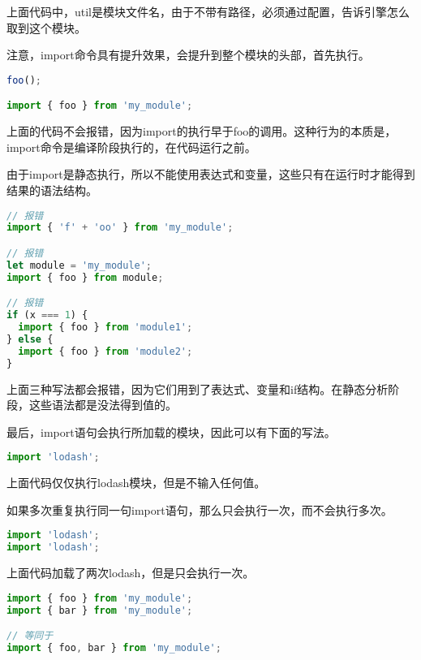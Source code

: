 上面代码中，util是模块文件名，由于不带有路径，必须通过配置，告诉引擎怎么取到这个模块。

注意，import命令具有提升效果，会提升到整个模块的头部，首先执行。

\begin{lstlisting}[language=JavaScript]
foo();

import { foo } from 'my_module';
\end{lstlisting}


上面的代码不会报错，因为import的执行早于foo的调用。这种行为的本质是，import命令是编译阶段执行的，在代码运行之前。



由于import是静态执行，所以不能使用表达式和变量，这些只有在运行时才能得到结果的语法结构。


\begin{lstlisting}[language=JavaScript]
// 报错
import { 'f' + 'oo' } from 'my_module';

// 报错
let module = 'my_module';
import { foo } from module;

// 报错
if (x === 1) {
  import { foo } from 'module1';
} else {
  import { foo } from 'module2';
}
\end{lstlisting}


上面三种写法都会报错，因为它们用到了表达式、变量和if结构。在静态分析阶段，这些语法都是没法得到值的。

最后，import语句会执行所加载的模块，因此可以有下面的写法。

\begin{lstlisting}[language=JavaScript]
import 'lodash';
\end{lstlisting}


上面代码仅仅执行lodash模块，但是不输入任何值。

如果多次重复执行同一句import语句，那么只会执行一次，而不会执行多次。



\begin{lstlisting}[language=JavaScript]
import 'lodash';
import 'lodash';
\end{lstlisting}

上面代码加载了两次lodash，但是只会执行一次。




\begin{lstlisting}[language=JavaScript]
import { foo } from 'my_module';
import { bar } from 'my_module';

// 等同于
import { foo, bar } from 'my_module';
\end{lstlisting}

